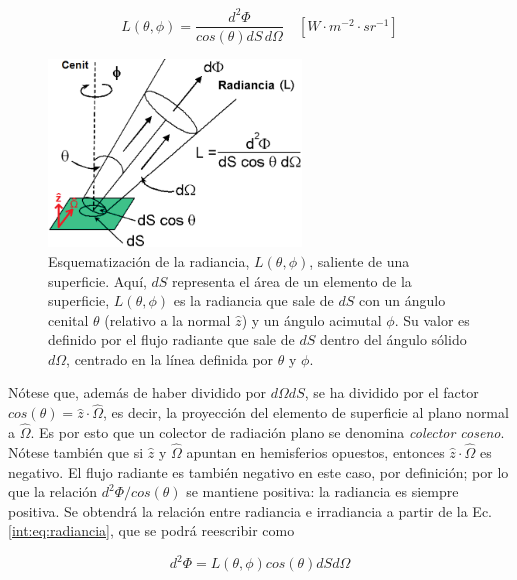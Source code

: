         \begin{equation}
         L(\theta,\phi)=\frac{d^{2}\Phi}{cos(\theta)dS\,d\Omega}\quad [W\cdot m^{-2} \cdot sr^{-1}]
        \label{int:eq:radiancia}
        \end{equation}

        \begin{figure}
        \centering
        \includegraphics[width=0.6\textwidth]{int/figures/radiancia}
        \caption[Esquematización de la radiancia, $L(\theta,\phi)$, saliente de una superficie.]{Esquematización de la radiancia, $L(\theta,\phi)$, saliente de una superficie. Aquí, $dS$ representa el área de un elemento de la superficie, $L(\theta,\phi)$ es la radiancia que sale de $dS$ con un ángulo cenital $\theta$ (relativo a la normal $\hat{z}$) y un ángulo acimutal $\phi$. Su valor es definido por el flujo radiante que sale de $dS$ dentro del ángulo sólido $d\Omega$, centrado en la línea definida por $\theta$ y $\phi$.} 
        \label{int:radiancia}
        \end{figure}

        Nótese que, además de haber dividido por $d\Omega dS$, se ha dividido por el factor $cos(\theta) = \hat{z}\cdot \hat{\Omega}$, es decir, la proyección del elemento de superficie al plano normal a $\hat{\Omega}$. Es por esto que un colector de radiación plano se denomina \textit{colector coseno}. Nótese también que si $\hat{z}$ y $\hat{\Omega}$ apuntan en hemisferios opuestos, entonces $\hat{z}\cdot \hat{\Omega}$ es negativo. El flujo radiante es también negativo en este caso, por definición; por lo que la relación $d^{2}\Phi/cos(\theta)$ se mantiene positiva: la radiancia es siempre positiva.             Se obtendrá la relación entre radiancia e irradiancia a partir de la Ec. \ref{int:eq:radiancia}, que se podrá reescribir como

        \begin{equation}
         d^{2}\Phi=L(\theta,\phi)cos(\theta) dS d\Omega
        \label{int:eq:radiancia_dif}
         \end{equation}
        
